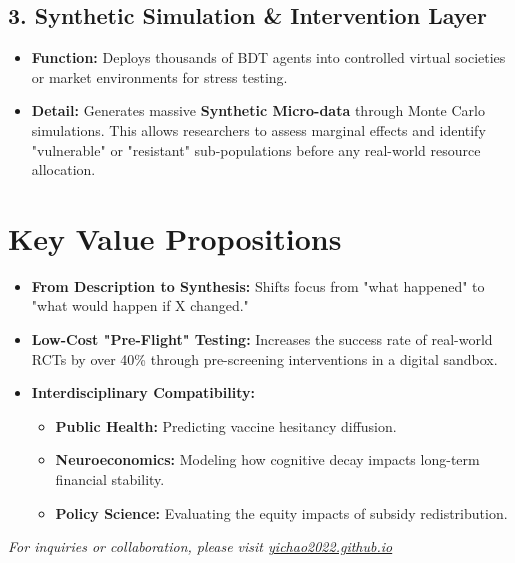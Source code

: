 \documentclass[11pt,a4paper]{article}
\begin{document}
\subsection*{3. Synthetic Simulation \& Intervention Layer}
\begin{itemize}[leftmargin=*, nosep]
    \item \textbf{Function:} Deploys thousands of BDT agents into controlled virtual societies or market environments for stress testing.
    \item \textbf{Detail:} Generates massive \textbf{Synthetic Micro-data} through Monte Carlo simulations. This allows researchers to assess marginal effects and identify "vulnerable" or "resistant" sub-populations before any real-world resource allocation.
\end{itemize}

\section*{Key Value Propositions}
\begin{itemize}[leftmargin=*]
    \item \textbf{From Description to Synthesis:} Shifts focus from "what happened" to "what would happen if X changed."
    \item \textbf{Low-Cost "Pre-Flight" Testing:} Increases the success rate of real-world RCTs by over 40\% through pre-screening interventions in a digital sandbox.
    \item \textbf{Interdisciplinary Compatibility:}
    \begin{itemize}
        \item \textbf{Public Health:} Predicting vaccine hesitancy diffusion.
        \item \textbf{Neuroeconomics:} Modeling how cognitive decay impacts long-term financial stability.
        \item \textbf{Policy Science:} Evaluating the equity impacts of subsidy redistribution.
    \end{itemize}
\end{itemize}

\vspace{1.5cm}
\begin{center}
    \small \color{gray} \textit{For inquiries or collaboration, please visit \href{https://yichao2022.github.io}{yichao2022.github.io}}
\end{center}
\end{document}
